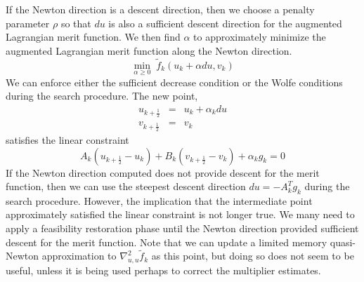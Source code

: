 If the Newton direction is a descent direction, then we choose a 
penalty parameter $\rho$ so that $du$ is also a sufficient descent 
direction for the augmented Lagrangian merit function.  We 
then find $\alpha$ to approximately minimize the augmented 
Lagrangian merit function along the Newton direction.
\[
\displaystyle \min_{\alpha \geq 0} \; \tilde{f}_k(u_k + \alpha du, v_k)
\]
We can enforce either the sufficient decrease condition or the 
Wolfe conditions during the search procedure.  The new point, 
\[
\begin{array}{lcl}
u_{k+\frac{1}{2}} & = & u_k + \alpha_k du \\
v_{k+\frac{1}{2}} & = & v_k
\end{array}
\]
satisfies the linear constraint
\[
A_k (u_{k+\frac{1}{2}} - u_k) + B_k (v_{k+\frac{1}{2}} - v_k) + \alpha_k g_k = 0
\]
If the Newton direction computed does not provide descent for the merit 
function, then we can use the steepest descent direction $du = -A_k^T g_k$ 
during the search procedure.  However, the implication that the intermediate
point approximately satisfied the linear constraint is not longer true.
We many need to apply a feasibility restoration phase until the Newton
direction provided sufficient descent for the merit function.
Note that we can update a limited memory quasi-Newton approximation
to $\nabla^2_{u,u} \tilde{f}_k$ as this point, but doing so does not
seem to be useful, unless it is being used perhaps to correct the 
multiplier estimates.
